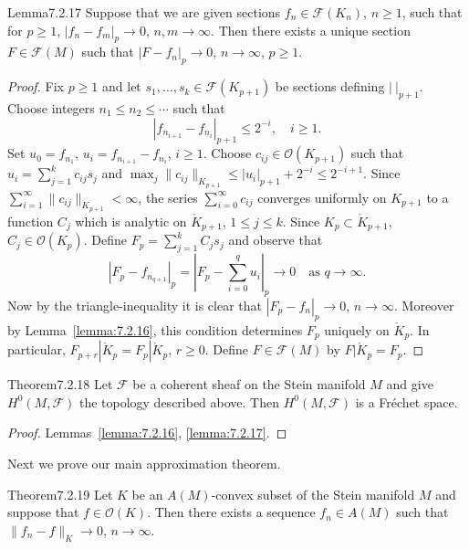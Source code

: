\begin{originaltheorem}{Lemma}{7.2.17}
Suppose that we are given sections $f_n\in\mathcal F(K_n)$, $n\geq1$, such that for $p\geq1$, $|f_n-f_m|_p\to0$, $n,m\to\infty$. Then there exists a unique section $F\in\mathcal F(M)$ such that $|F-f_n|_p\to0$, $n\to\infty$, $p\geq1$.
\end{originaltheorem}
\begin{proof}
Fix $p\geq1$ and let $s_1,\ldots,s_k\in\mathcal F(K_{p+1})$ be sections defining $|\ |_{p+1}$. Choose integers $n_1\leq n_2\leq\cdots$ such that
\[
|f_{n_{i+1}}-f_{n_i}|_{p+1}\leq2^{-i},\quad i\geq1.
\]
Set $u_0=f_{n_1}$, $u_i=f_{n_{i+1}}-f_{n_i}$, $i\geq1$. Choose $c_{ij}\in\mathcal O(K_{p+1})$ such that $u_i=\sum_{j=1}^k c_{ij}s_j$ and $\max_j\|c_{ij}\|_{K_{p+1}}\leq|u_i|_{p+1}+2^{-i}\leq2^{-i+1}$. Since $\sum_{i=1}^\infty\|c_{ij}\|_{K_{p+1}}<\infty$, the series $\sum_{i=0}^\infty c_{ij}$ converges uniformly on $K_{p+1}$ to a function $C_j$ which is analytic on $\mathring K_{p+1}$, $1\leq j\leq k$. Since $K_p\subset\mathring K_{p+1}$, $C_j\in\mathcal O(K_p)$. Define $F_p=\sum_{j=1}^k C_js_j$ and observe that
\[
|F_p-f_{n_{q+1}}|_p=\left|F_p-\sum_{i=0}^q u_i\right|_p\to0\quad\text{as }q\to\infty.
\]
Now by the triangle-inequality it is clear that $|F_p-f_n|_p\to0$, $n\to\infty$. Moreover by Lemma~\ref{lemma:7.2.16}, this condition determines $F_p$ uniquely on $\mathring K_p$. In particular, $F_{p+r}|\mathring K_p=F_p|\mathring K_p$, $r\geq0$. Define $F\in\mathcal F(M)$ by $F|\mathring K_p=F_p$.
\end{proof}
\begin{originaltheorem}{Theorem}{7.2.18}
Let $\mathcal F$ be a coherent sheaf on the Stein manifold $M$ and give $H^0(M,\mathcal F)$ the topology described above. Then $H^0(M,\mathcal F)$ is a Fr\'echet space.
\end{originaltheorem}
\begin{proof}
Lemmas~\ref{lemma:7.2.16}, \ref{lemma:7.2.17}.
\end{proof}
Next we prove our main approximation theorem.
\begin{originaltheorem}{Theorem}{7.2.19}
Let $K$ be an $A(M)$-convex subset of the Stein manifold $M$ and suppose that $f\in\mathcal O(K)$. Then there exists a sequence $f_n\in A(M)$ such that $\|f_n-f\|_K\to0$, $n\to\infty$.
\end{originaltheorem}
